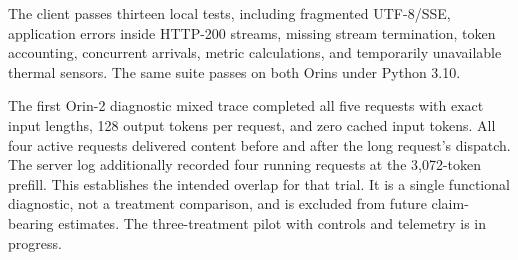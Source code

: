 The client passes thirteen local tests, including fragmented UTF-8/SSE, application errors inside HTTP-200 streams, missing stream termination, token accounting, concurrent arrivals, metric calculations, and temporarily unavailable thermal sensors. The same suite passes on both Orins under Python 3.10.

The first Orin-2 diagnostic mixed trace completed all five requests with exact input lengths, 128 output tokens per request, and zero cached input tokens. All four active requests delivered content before and after the long request's dispatch. The server log additionally recorded four running requests at the 3,072-token prefill. This establishes the intended overlap for that trial. It is a single functional diagnostic, not a treatment comparison, and is excluded from future claim-bearing estimates. The three-treatment pilot with controls and telemetry is in progress.

